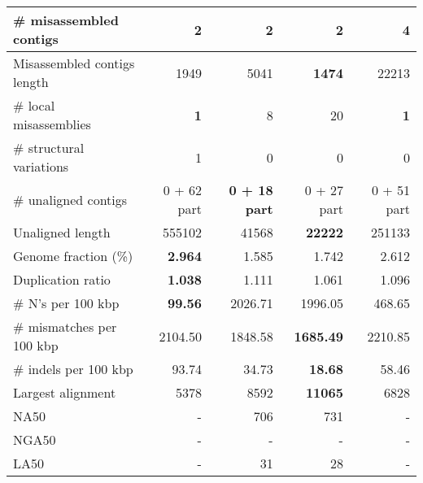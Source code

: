 \documentclass[12pt,a4paper]{article}
\begin{document}
\begin{table}[ht]
\begin{center}
\begin{tabular}{|l*{4}{|r}|}
\# misassembled contigs & {\bf 2} & {\bf 2} & {\bf 2} & 4 \\ \hline
Misassembled contigs length & 1949 & 5041 & {\bf 1474} & 22213 \\ \hline
\# local misassemblies & {\bf 1} & 8 & 20 & {\bf 1} \\ \hline
\# structural variations & 1 & 0 & 0 & 0 \\ \hline
\# unaligned contigs & 0 + 62 part & {\bf 0 + 18 part} & 0 + 27 part & 0 + 51 part \\ \hline
Unaligned length & 555102 & 41568 & {\bf 22222} & 251133 \\ \hline
Genome fraction (\%) & {\bf 2.964} & 1.585 & 1.742 & 2.612 \\ \hline
Duplication ratio & {\bf 1.038} & 1.111 & 1.061 & 1.096 \\ \hline
\# N's per 100 kbp & {\bf 99.56} & 2026.71 & 1996.05 & 468.65 \\ \hline
\# mismatches per 100 kbp & 2104.50 & 1848.58 & {\bf 1685.49} & 2210.85 \\ \hline
\# indels per 100 kbp & 93.74 & 34.73 & {\bf 18.68} & 58.46 \\ \hline
Largest alignment & 5378 & 8592 & {\bf 11065} & 6828 \\ \hline
NA50 & - & 706 & 731 & - \\ \hline
NGA50 & - & - & - & - \\ \hline
LA50 & - & 31 & 28 & - \\ \hline
\end{tabular}
\end{center}
\end{table}
\end{document}

